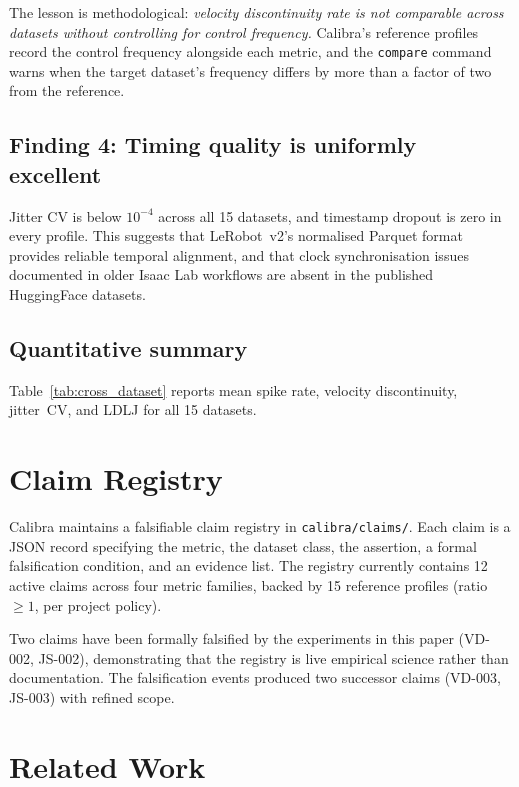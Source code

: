 \documentclass[10pt,twocolumn]{article}
\begin{document}
The lesson is methodological: \emph{velocity discontinuity rate is not
comparable across datasets without controlling for control frequency.}
Calibra's reference profiles record the control frequency alongside each
metric, and the \texttt{compare} command warns when the target dataset's
frequency differs by more than a factor of two from the reference.

\subsection{Finding 4: Timing quality is uniformly excellent}

Jitter CV is below $10^{-4}$ across all 15 datasets, and timestamp
dropout is zero in every profile. This suggests that LeRobot~v2's
normalised Parquet format provides reliable temporal alignment, and that
clock synchronisation issues documented in older Isaac Lab workflows are
absent in the published HuggingFace datasets.

\subsection{Quantitative summary}

Table~\ref{tab:cross_dataset} reports mean spike rate, velocity discontinuity,
jitter~CV, and LDLJ for all 15 datasets.



\section{Claim Registry}
\label{sec:claims}

Calibra maintains a falsifiable claim registry in
\texttt{calibra/claims/}. Each claim is a JSON record specifying the
metric, the dataset class, the assertion, a formal falsification
condition, and an evidence list. The registry currently contains 12
active claims across four metric families, backed by 15 reference
profiles (ratio $\geq 1$, per project policy).

Two claims have been formally falsified by the experiments in this
paper (VD-002, JS-002), demonstrating that the registry is live
empirical science rather than documentation. The falsification events
produced two successor claims (VD-003, JS-003) with refined scope.

\section{Related Work}
\label{sec:related}
\end{document}
